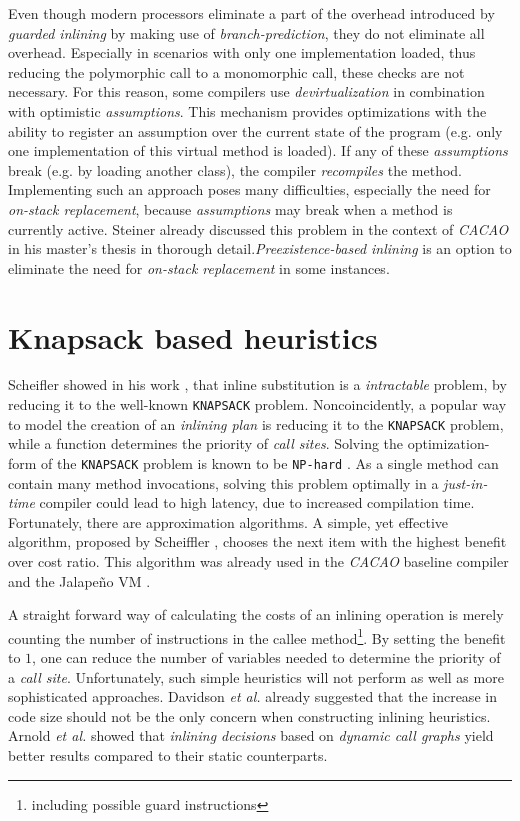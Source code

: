 \documentclass[draft, final]{vutinfth} %
\begin{document}
Even though modern processors eliminate a part of the overhead introduced by \emph{guarded inlining} by making use of \emph{branch-prediction}, they do not eliminate all overhead. Especially in scenarios with only one implementation loaded, thus reducing the polymorphic call to a monomorphic call, these checks are not necessary. For this reason, some compilers use \emph{devirtualization} in combination with optimistic \emph{assumptions}. This mechanism provides optimizations with the ability to register an assumption over the current state of the program (e.g. only one implementation of this virtual method is loaded). If any of these \emph{assumptions} break (e.g. by loading another class), the compiler \emph{recompiles} the method. Implementing such an approach poses many difficulties, especially the need for \emph{on-stack replacement}, because \emph{assumptions} may break when a method is currently active. Steiner already discussed this problem in the context of \emph{CACAO} in his master's thesis \cite{SteinerM07} in thorough detail.\emph{Preexistence-based inlining} is an option to eliminate the need for \emph{on-stack replacement} in some instances\cite{Detlefs99}.

\section{Knapsack based heuristics}
\label{sec:sota-knapsack}

Scheifler showed in his work \cite{Scheifler77}, that inline substitution is a \emph{intractable} problem, by reducing it to the well-known \texttt{KNAPSACK} problem. Noncoincidently, a popular way to model the creation of an \emph{inlining plan} is reducing it to the \texttt{KNAPSACK} problem, while a function determines the priority of \emph{call sites}. Solving the optimization-form of the \texttt{KNAPSACK} problem is known to be \texttt{NP-hard} \cite{Scheifler77}. As a single method can contain many method invocations, solving this problem optimally in a \emph{just-in-time} compiler could lead to high latency, due to increased compilation time. Fortunately, there are approximation algorithms. A simple, yet effective algorithm, proposed by Scheiffler \cite{Scheifler77}, chooses the next item with the highest benefit over cost ratio. This algorithm was already used in the \emph{CACAO} baseline compiler \cite{Steiner07} and the Jalapeño VM \cite{Arnold00}.

A straight forward way of calculating the costs of an inlining operation is merely counting the number of instructions in the callee method\footnote{including possible guard instructions}. By setting the benefit to $1$, one can reduce the number of variables needed to determine the priority of a \emph{call site}. Unfortunately, such simple heuristics will not perform as well as more sophisticated approaches. Davidson \emph{et al.} \cite{Davidson92} already suggested that the increase in code size should not be the only concern when constructing inlining heuristics. Arnold \emph{et al.} showed \cite{Arnold00} that \emph{inlining decisions} based on \emph{dynamic call graphs} yield better results compared to their static counterparts.
\end{document}
